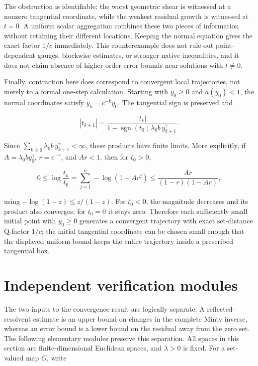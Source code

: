 \documentclass[11pt,a4paper]{article}
\theoremstyle{plain}
\theoremstyle{definition}
\theoremstyle{remark}
\begin{document}
The obstruction is identifiable: the worst geometric shear is witnessed
at a nonzero tangential coordinate, while the weakest residual growth is
witnessed at \(t=0\). A uniform scalar aggregation combines these two
pieces of information without retaining their different locations.
Keeping the normal equation gives the exact factor \(1/c\) immediately.
This counterexample does not rule out point-dependent gauges, blockwise
estimates, or stronger native inequalities, and it does not claim
absence of higher-order error bounds near solutions with \(t\ne0\).

Finally, contraction here does correspond to convergent local
trajectories, not merely to a formal one-step calculation. Starting with
\(y_0\ge0\) and \(a(y_0)<1\), the normal coordinates satisfy
\(y_k=c^{-k}y_0\). The tangential sign is preserved and

\[
|t_{k+1}|=\frac{|t_k|}{1-\operatorname{sgn}(t_0)\lambda_0b\,y_{k+1}^\gamma}.
\]

Since \(\sum_{k\ge0}\lambda_0b\,y_{k+1}^\gamma<\infty\), these products
have finite limits. More explicitly, if \(A=\lambda_0b y_0^\gamma\),
\(r=c^{-\gamma}\), and \(Ar<1\), then for \(t_0>0\),

\[
0\le\log\frac{t_n}{t_0}
=\sum_{j=1}^n-\log(1-Ar^j)
\le\frac{Ar}{(1-r)(1-Ar)},
\]

using \(-\log(1-z)\le z/(1-z)\). For \(t_0<0\), the magnitude decreases
and its product also converges; for \(t_0=0\) it stays zero. Therefore
each sufficiently small initial point with \(y_0\ge0\) generates a
convergent trajectory with exact set-distance Q-factor \(1/c\); the
initial tangential coordinate can be chosen small enough that the
displayed uniform bound keeps the entire trajectory inside a prescribed
tangential box.

\hypertarget{independent-verification-modules}{%
\section{Independent verification
modules}\label{independent-verification-modules}}

The two inputs to the convergence result are logically separate. A
reflected-resolvent estimate is an upper bound on changes in the
complete Minty inverse, whereas an error bound is a lower bound on the
residual away from the zero set. The following elementary modules
preserve this separation. All spaces in this section are
finite-dimensional Euclidean spaces, and \(\lambda>0\) is fixed. For a
set-valued map \(G\), write
\end{document}

